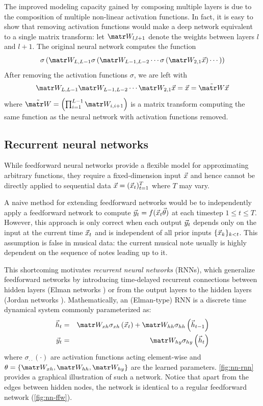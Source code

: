 \documentclass[dissertation.tex]{subfiles}
\begin{document}
The improved modeling capacity gained by composing multiple layers is due to
the composition of multiple non-linear activation functions.
In fact, it is easy to show that removing activation functions would make
a deep network equivalent to a single matrix transform: let $\W_{l,l+1}$
denote the weights between layers $l$ and $l+1$. The original neural network
computes the function
\begin{equation}
    \sigma\left(
        \W_{L,L-1} \sigma \left(
            \W_{L-1,L-2}\cdots \sigma \left(
                \W_{2,1} \x
            \right) \cdots
        \right)
    \right)
\end{equation}
After removing the activation functions $\sigma$, we are left with
\begin{equation}
    \W_{L,L-1} \W_{L-1,L-2}\cdots \W_{2,1} \x
    = \x
    = \tilde{\W} \x
\end{equation}
where $\tilde{\W} = \left(\prod_{i=1}^{L-1} \W_{i,i+1} \right)$
is a matrix transform computing the same function as the neural network with
activation functions removed.

\subsection{Recurrent neural networks}

While feedforward neural networks provide a flexible model for approximating
arbitrary functions, they require a fixed-dimension input $\vec{x}$ and hence
cannot be directly applied to sequential data $\vec{x} = (\vec{x}_t)_{t=1}^T$ where $T$ may
vary.

A naive method for extending feedforward networks would be to independently
apply a feedforward network to compute $\vec{y}_t = f(\vec{x}_t \vec{\theta})$ at each timestep
$1 \leq t \leq T$. However, this approach is only correct when each output
$\vec{y}_t$ depends only on the input at the current time $\vec{x}_t$ and is independent of
all prior inputs $\{\vec{x}_k\}_{k < t}$. This assumption is false in musical data:
the current musical note usually is highly dependent on the sequence of notes
leading up to it.

This shortcoming motivates \emph{recurrent neural networks} (RNNs), which
generalize feedforward networks by introducing time-delayed recurrent
connections between hidden layers (Elman networks \cite{elman1990finding}) or
from the output layers to the hidden layers (Jordan networks
\cite{jordan1997serial}). Mathematically, an (Elman-type) RNN is a discrete time
dynamical system commonly parameterized as:
\begin{eqnarray}
    \h_t &=& \W_{xh} \sigma_{xh} \left( \x_t \right) + \W_{hh} \sigma_{hh} \left( \h_{t-1} \right) \label{eq:rnn-ht}\\
    \y_t &=& \W_{hy} \sigma_{hy} \left( \h_t \right) \label{eq:rnn-yt}
\end{eqnarray}
where $\sigma_{\cdot \cdot}(\cdot)$ are activation functions acting
element-wise and $\theta = \{ \W_{xh}, \W_{hh}, \W_{hy}\}$ are the learned
parameters. \autoref{fig:nn-rnn} provides a graphical illustration of such a
network. Notice that apart from the edges between hidden nodes, the network is
identical to a regular feedforward network (\autoref{fig:nn-ffw}).
\end{document}
